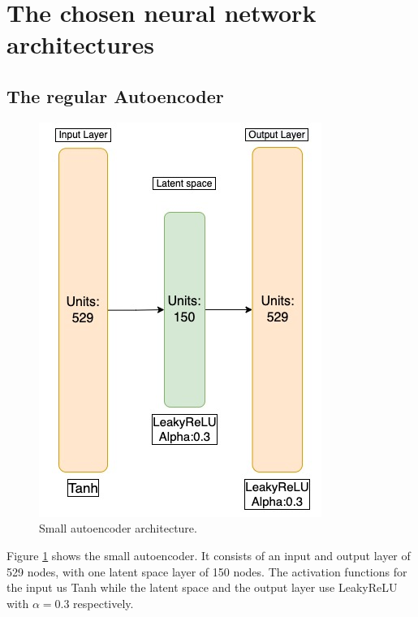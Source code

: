\section{The chosen neural network architectures}

\subsection*{The regular Autoencoder}

\begin{figure}[H]
    \centering
    \includegraphics[scale=0.4]{Figures/nnarchitect/ae_small.jpeg}
    \caption[AE | Small network architecture]{Small autoencoder architecture.}
    \label{fig:ae_small}
\end{figure}

Figure \ref{fig:ae_small} shows the small autoencoder. It consists of an input and output layer of 529 nodes, with 
one latent space layer of 150 nodes. The activation functions for the input us Tanh while the latent space and the 
output layer use LeakyReLU with $\alpha=0.3$ respectively.


